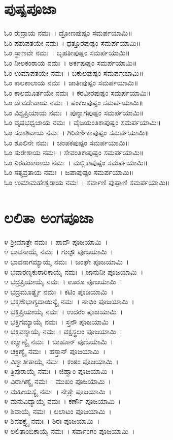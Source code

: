 \section{ಪುಷ್ಪಪೂಜಾ}
ಓಂ ರುದ್ರಾಯ ನಮಃ~। ದ್ರೋಣಪುಷ್ಪಂ ಸಮರ್ಪಯಾಮಿ॥\\
ಓಂ ಪಶುಪತಯೇ ನಮಃ~। ಧತ್ತೂರಪುಷ್ಪಂ ಸಮರ್ಪಯಾಮಿ॥\\
ಓಂ ಸ್ಥಾಣವೇ ನಮಃ~। ಬೃಹತೀಪುಷ್ಪಂ ಸಮರ್ಪಯಾಮಿ॥\\
ಓಂ ನೀಲಕಂಠಾಯ ನಮಃ~। ಅರ್ಕಪುಷ್ಪಂ ಸಮರ್ಪಯಾಮಿ॥\\
ಓಂ ಉಮಾಪತಯೇ ನಮಃ~। ಬಕುಲಪುಷ್ಪಂ ಸಮರ್ಪಯಾಮಿ॥\\
ಓಂ ಕಾಲಕಾಲಾಯ ನಮಃ~। ಜಾತೀಪುಷ್ಪಂ ಸಮರ್ಪಯಾಮಿ॥\\
ಓಂ ಕಾಲಮೂರ್ತಯೇ ನಮಃ~। ಕರವೀರಪುಷ್ಪಂ ಸಮರ್ಪಯಾಮಿ॥\\
ಓಂ ದೇವದೇವಾಯ ನಮಃ~। ಪಂಕಜಪುಷ್ಪಂ ಸಮರ್ಪಯಾಮಿ॥\\
ಓಂ ವಿಶ್ವಪ್ರಿಯಾಯ ನಮಃ~। ಪುನ್ನಾಗಪುಷ್ಪಂ ಸಮರ್ಪಯಾಮಿ॥\\
ಓಂ ವೃಷಭಧ್ವಜಾಯ ನಮಃ~। ವೈಜಯಂತಿಕಾಪುಷ್ಪಂ ಸಮರ್ಪಯಾಮಿ॥\\
ಓಂ ಸದಾಶಿವಾಯ ನಮಃ~। ಗಿರಿಕರ್ಣಿಕಾಪುಷ್ಪಂ ಸಮರ್ಪಯಾಮಿ॥\\
ಓಂ ಶೂಲಿನೇ ನಮಃ~। ಚಂಪಕಪುಷ್ಪಂ ಸಮರ್ಪಯಾಮಿ॥\\
ಓಂ ಸುರೇಶಾಯ ನಮಃ~। ಸೇವಂತಿಕಾಪುಷ್ಪಂ ಸಮರ್ಪಯಾಮಿ॥\\
ಓಂ ನಿರಹಂಕಾರಾಯ ನಮಃ~। ಮಲ್ಲಿಕಾಪುಷ್ಪಂ ಸಮರ್ಪಯಾಮಿ॥\\
ಓಂ ಸತ್ಯವ್ರತಾಯ ನಮಃ~। ಜಪಾಪುಷ್ಪಂ ಸಮರ್ಪಯಾಮಿ॥\\
ಓಂ ಉಮಾಮಹೇಶ್ವರಾಯ ನಮಃ~। ಸರ್ವಾಣಿ ಪುಷ್ಪಾಣಿ ಸಮರ್ಪಯಾಮಿ॥
\section{ಲಲಿತಾ ಅಂಗಪೂಜಾ}
೪ ಶ್ರೀಮಾತ್ರೇ ನಮಃ~। ಪಾದೌ ಪೂಜಯಾಮಿ~।\\
೪ ಭಾವನಾಯೈ ನಮಃ~। ಗುಲ್ಫೌ ಪೂಜಯಾಮಿ~।\\
೪ ಭಾವನಾಗಮ್ಯಾಯೈ ನಮಃ~। ಜಂಘೇ ಪೂಜಯಾಮಿ~।\\
೪ ಭವಾರಣ್ಯಕುಠಾರಿಕಾಯೈ ನಮಃ~। ಜಾನುನೀ ಪೂಜಯಾಮಿ~।\\
೪ ಭದ್ರಪ್ರಿಯಾಯೈ ನಮಃ~। ಊರೂ ಪೂಜಯಾಮಿ~।\\
೪ ಭದ್ರಮೂರ್ತ್ಯೈ ನಮಃ~। ಕಟಿಂ ಪೂಜಯಾಮಿ~।\\
೪ ಭಕ್ತಸೌಭಾಗ್ಯದಾಯಿನ್ಯೈ ನಮಃ~। ನಾಭಿಂ ಪೂಜಯಾಮಿ~।\\
೪ ಭಕ್ತಿಪ್ರಿಯಾಯೈ ನಮಃ~। ಉದರಂ ಪೂಜಯಾಮಿ~।\\
೪ ಭಕ್ತಿಗಮ್ಯಾಯೈ ನಮಃ~। ಸ್ತನೌ ಪೂಜಯಾಮಿ~।\\
೪ ಭಕ್ತಿವಶ್ಯಾಯೈ ನಮಃ~। ವಕ್ಷಸ್ಥಲಂ ಪೂಜಯಾಮಿ~।\\
೪ ಕಲ್ಯಾಣ್ಯೈ ನಮಃ~। ಬಾಹೂನ್ ಪೂಜಯಾಮಿ~।\\
೪ ಚಕ್ರಿಣ್ಯೈ ನಮಃ~। ಹಸ್ತಾನ್ ಪೂಜಯಾಮಿ~।\\
೪ ವಿಶ್ವಾತೀತಾಯೈ ನಮಃ~। ಕಂಠಂ ಪೂಜಯಾಮಿ~।\\
೪ ತ್ರಿಪುರಾಯೈ ನಮಃ~। ಜಿಹ್ವಾಂ ಪೂಜಯಾಮಿ~।\\
೪ ವಿರಾಗಿಣ್ಯೈ ನಮಃ~। ಮುಖಂ ಪೂಜಯಾಮಿ~।\\
೪ ಮಹೀಯಸ್ಯೈ ನಮಃ~। ನೇತ್ರೇ ಪೂಜಯಾಮಿ~।\\
೪ ಮನುವಿದ್ಯಾಯೈ ನಮಃ~। ಕರ್ಣೌ ಪೂಜಯಾಮಿ~।\\
೪ ಶಿವಾಯೈ ನಮಃ~। ಲಲಾಟಂ ಪೂಜಯಾಮಿ~।\\
೪ ಶಿವಶಕ್ತ್ಯೈ ನಮಃ~। ಶಿರಃ ಪೂಜಯಾಮಿ~।\\
೪ ಲಲಿತಾಂಬಿಕಾಯೈ ನಮಃ~। ಸರ್ವಾಂಗಂ ಪೂಜಯಾಮಿ~।
